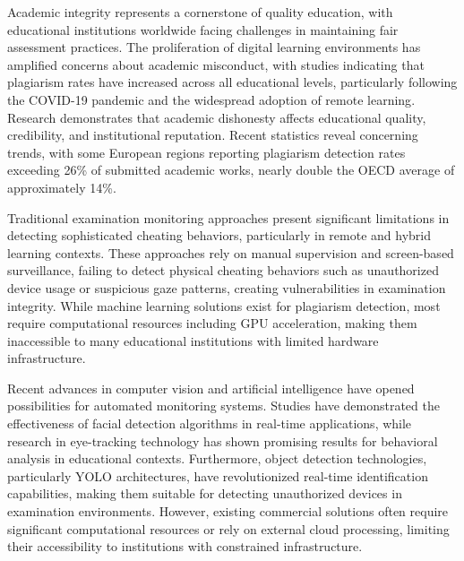 \documentclass[conference]{IEEEtran}
\begin{document}
Academic integrity represents a cornerstone of quality education, with educational 
institutions worldwide facing challenges in maintaining fair assessment 
practices. The proliferation of digital learning environments has amplified concerns 
about academic misconduct, with studies indicating that plagiarism rates have increased 
across all educational levels, particularly following the COVID-19 pandemic and the 
widespread adoption of remote learning\cite{updated_pandemic_reference}. Research 
demonstrates that academic dishonesty affects educational quality, credibility, and institutional reputation\cite{pelican2021plagiat}. 
Recent statistics reveal concerning trends, with some European regions reporting plagiarism 
detection rates exceeding 26\% of submitted academic works, nearly double the 
OECD average of approximately 14\%\cite{updated_regional_statistics}.

Traditional examination monitoring approaches present significant limitations 
in detecting sophisticated cheating behaviors, particularly in remote and hybrid 
learning contexts\cite{updated_hybrid_learning}. These approaches rely on manual supervision and screen-based surveillance, 
failing to detect physical cheating behaviors such as unauthorized device usage or suspicious gaze patterns, 
creating vulnerabilities in examination integrity\cite{dilini2021cheating}. While machine learning solutions exist for plagiarism 
detection\cite{russell2020artificial}, most require computational resources 
including GPU acceleration, making them inaccessible to many educational institutions 
with limited hardware infrastructure.

Recent advances in computer vision and artificial intelligence have opened 
possibilities for automated monitoring systems. Studies have demonstrated the effectiveness 
of facial detection algorithms in real-time applications\cite{hasan2021face}, while 
research in eye-tracking technology has shown promising results for behavioral analysis 
in educational contexts\cite{el2023drowsiness}. Furthermore, object detection technologies, 
particularly YOLO architectures, have revolutionized real-time identification 
capabilities\cite{wang2022object}, making them suitable for detecting unauthorized 
devices in examination environments. However, existing commercial solutions often require significant computational resources 
or rely on external cloud processing, limiting their accessibility to institutions 
with constrained infrastructure\cite{honorlock2023detecting,proctoru}.
\end{document}
